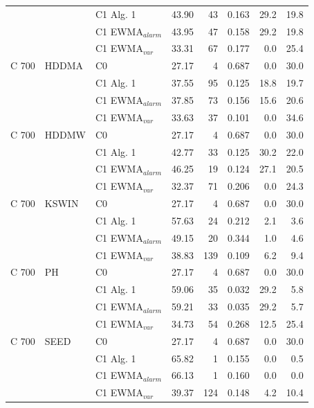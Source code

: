 \begin{longtable}{lllrrrrr}
 &  & C1 Alg. 1 & 43.90 & 43 & 0.163 & 29.2 & 19.8 \\
 &  & C1 EWMA$_{alarm}$ & 43.95 & 47 & 0.158 & 29.2 & 19.8 \\
 &  & C1 EWMA$_{var}$ & 33.31 & 67 & 0.177 & 0.0 & 25.4 \\
\hline
C  700 & HDDMA & C0 & 27.17 & 4 & 0.687 & 0.0 & 30.0 \\
 &  & C1 Alg. 1 & 37.55 & 95 & 0.125 & 18.8 & 19.7 \\
 &  & C1 EWMA$_{alarm}$ & 37.85 & 73 & 0.156 & 15.6 & 20.6 \\
 &  & C1 EWMA$_{var}$ & 33.63 & 37 & 0.101 & 0.0 & 34.6 \\
\hline
C  700 & HDDMW & C0 & 27.17 & 4 & 0.687 & 0.0 & 30.0 \\
 &  & C1 Alg. 1 & 42.77 & 33 & 0.125 & 30.2 & 22.0 \\
 &  & C1 EWMA$_{alarm}$ & 46.25 & 19 & 0.124 & 27.1 & 20.5 \\
 &  & C1 EWMA$_{var}$ & 32.37 & 71 & 0.206 & 0.0 & 24.3 \\
\hline
C  700 & KSWIN & C0 & 27.17 & 4 & 0.687 & 0.0 & 30.0 \\
 &  & C1 Alg. 1 & 57.63 & 24 & 0.212 & 2.1 & 3.6 \\
 &  & C1 EWMA$_{alarm}$ & 49.15 & 20 & 0.344 & 1.0 & 4.6 \\
 &  & C1 EWMA$_{var}$ & 38.83 & 139 & 0.109 & 6.2 & 9.4 \\
\hline
C  700 & PH & C0 & 27.17 & 4 & 0.687 & 0.0 & 30.0 \\
 &  & C1 Alg. 1 & 59.06 & 35 & 0.032 & 29.2 & 5.8 \\
 &  & C1 EWMA$_{alarm}$ & 59.21 & 33 & 0.035 & 29.2 & 5.7 \\
 &  & C1 EWMA$_{var}$ & 34.73 & 54 & 0.268 & 12.5 & 25.4 \\
\hline
C  700 & SEED & C0 & 27.17 & 4 & 0.687 & 0.0 & 30.0 \\
 &  & C1 Alg. 1 & 65.82 & 1 & 0.155 & 0.0 & 0.5 \\
 &  & C1 EWMA$_{alarm}$ & 66.13 & 1 & 0.160 & 0.0 & 0.0 \\
 &  & C1 EWMA$_{var}$ & 39.37 & 124 & 0.148 & 4.2 & 10.4 \\
\hline
\end{longtable}
